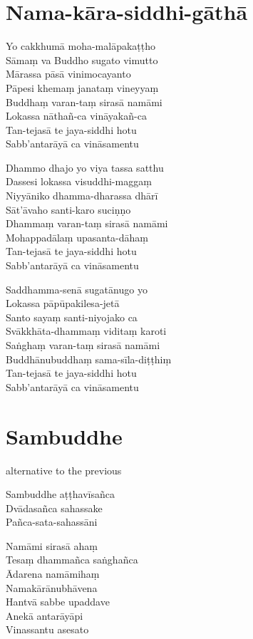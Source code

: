 \chapter{Nama-kāra-siddhi-gāthā}

Yo cakkhumā moha-malāpakaṭṭho\\
Sāmaṃ va Buddho sugato vimutto\\
Mārassa pāsā vinimocayanto\\
Pāpesi khemaṃ janataṃ vineyyaṃ\\
Buddhaṃ varan-taṃ sirasā namāmi\\
Lokassa nāthañ-ca vināyakañ-ca\\
Tan-tejasā te jaya-siddhi hotu\\
Sabb'antarāyā ca vināsamentu

Dhammo dhajo yo viya tassa satthu\\
Dassesi lokassa visuddhi-maggaṃ\\
Niyyāniko dhamma-dharassa dhārī\\
Sāt'āvaho santi-karo suciṇṇo\\
Dhammaṃ varan-taṃ sirasā namāmi\\
Mohappadālaṃ upasanta-dāhaṃ\\
Tan-tejasā te jaya-siddhi hotu\\
Sabb'antarāyā ca vināsamentu

Saddhamma-senā sugatānugo yo\\
Lokassa pāpūpakilesa-jetā\\
Santo sayaṃ santi-niyojako ca\\
Svākkhāta-dhammaṃ viditaṃ karoti\\
Saṅghaṃ varan-taṃ sirasā namāmi\\
Buddhānubuddhaṃ sama-sīla-diṭṭhiṃ\\
Tan-tejasā te jaya-siddhi hotu\\
Sabb'antarāyā ca vināsamentu

\chapter{Sambuddhe}

\begin{instruction}
alternative to the previous
\end{instruction}

Sambuddhe aṭṭhavīsañca\\
Dvādasañca sahassake\\
Pañca-sata-sahassāni

Namāmi sirasā ahaṃ\\
Tesaṃ dhammañca saṅghañca\\
Ādarena namāmihaṃ\\
Namakārānubhāvena\\
Hantvā sabbe upaddave\\
Anekā antarāyāpi\\
Vinassantu asesato

